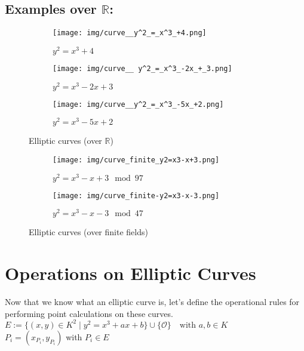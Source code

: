 \documentclass[bp,en]{FEIstyle}
\newcommand{\point}[1]{
#1 = (x_{#1}, y_{#1})
}
\begin{document}
\subsection*{Examples over $\mathbb{R}$:}
\begin{figure}[H]
    \centering
    \begin{subfigure}{0.3\textwidth}
        \texttt{[image: img/curve\_\_y^2\_=\_x^3\_+4.png]}
        \caption{$y^2 = x^3 + 4$}
        \label{fig:example_curve_1}
    \end{subfigure}%
    \hfill %
    \begin{subfigure}{0.3\textwidth}
        \texttt{[image: img/curve\_\_ y^2\_=\_x^3\_-2x\_+\_3.png]}
        \caption{$y^2 = x^3 - 2x + 3$}
        \label{fig:example_curve_2}
    \end{subfigure}%
    \hfill %
    \begin{subfigure}{0.3\textwidth}
        \texttt{[image: img/curve\_\_y^2\_=\_x^3\_-5x\_+2.png]}
        \caption{$y^2 = x^3 - 5x + 2$}
        \label{fig:example_curve_3}
    \end{subfigure}
    \caption{Elliptic curves (over $\mathbb{R}$)}
    \label{fig:example_elliptic_curves_1}
\end{figure}

\begin{figure}[H]
    \centering
    \begin{subfigure}{0.5\textwidth}
        \texttt{[image: img/curve\_finite\_y2=x3-x+3.png]}
        \caption{$y^2=x^3-x+3 \mod 97$}
        \label{fig:example_curve_4}
    \end{subfigure}%
    \begin{subfigure}{0.4841\textwidth}
        \texttt{[image: img/curve\_finite-y2=x3-x-3.png]}
        \caption{$y^2=x^3-x-3 \mod 47$}
        \label{fig:example_curve_5}
    \end{subfigure}%
    \caption{Elliptic curves (over finite fields)}
    \label{fig:example_elliptic_curves_2}
\end{figure}
\newpage
\section*{Operations on Elliptic Curves}
Now that we know what an elliptic curve is, let's define the operational rules for performing point calculations on these curves. \\
$E := \{ (x,y) \in K^2 \mid y^2 = x^3 + ax + b \} \cup \{ \mathcal{O} 
\} \quad \text{with } a, b \in K$ \\ 
$\point{P_i}$ with $P_i \in E$
\end{document}
